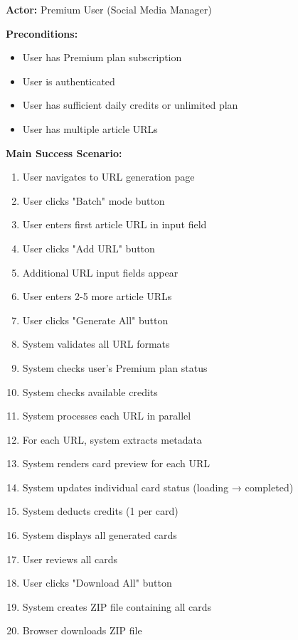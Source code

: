 \documentclass[12pt,a4paper]{article}
\begin{document}
\textbf{Actor:} Premium User (Social Media Manager)

\textbf{Preconditions:}
\begin{itemize}
    \item User has Premium plan subscription
    \item User is authenticated
    \item User has sufficient daily credits or unlimited plan
    \item User has multiple article URLs
\end{itemize}

\textbf{Main Success Scenario:}
\begin{enumerate}
    \item User navigates to URL generation page
    \item User clicks "Batch" mode button
    \item User enters first article URL in input field
    \item User clicks "Add URL" button
    \item Additional URL input fields appear
    \item User enters 2-5 more article URLs
    \item User clicks "Generate All" button
    \item System validates all URL formats
    \item System checks user's Premium plan status
    \item System checks available credits
    \item System processes each URL in parallel
    \item For each URL, system extracts metadata
    \item System renders card preview for each URL
    \item System updates individual card status (loading → completed)
    \item System deducts credits (1 per card)
    \item System displays all generated cards
    \item User reviews all cards
    \item User clicks "Download All" button
    \item System creates ZIP file containing all cards
    \item Browser downloads ZIP file
\end{enumerate}
\end{document}
